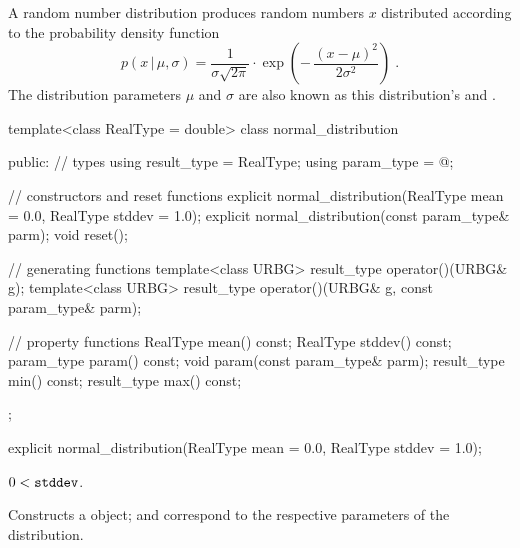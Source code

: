 \pnum
A  random number distribution
produces random numbers $x$
distributed according to
the probability density function%
%
%
\[%
 p(x\,|\,\mu,\sigma)
      = \frac{1}{\sigma \sqrt{2\pi}}
        \cdot
        \exp{\left(- \, \frac{(x - \mu)^2}
                             {2 \sigma^2}
             \right)
            }
\; \mbox{.}
\]
The distribution parameters $\mu$ and $\sigma$
are also known as this distribution's %
%
and %
%
%
.

%
\begin{codeblock}
template<class RealType = double>
  class normal_distribution {
  public:
    // types
    using result_type = RealType;
    using param_type  = @\unspec@;

    // constructors and reset functions
    explicit normal_distribution(RealType mean = 0.0, RealType stddev = 1.0);
    explicit normal_distribution(const param_type& parm);
    void reset();

    // generating functions
    template<class URBG>
      result_type operator()(URBG& g);
    template<class URBG>
      result_type operator()(URBG& g, const param_type& parm);

    // property functions
    RealType mean() const;
    RealType stddev() const;
    param_type param() const;
    void param(const param_type& parm);
    result_type min() const;
    result_type max() const;
  };
\end{codeblock}


%
\begin{itemdecl}
explicit normal_distribution(RealType mean = 0.0, RealType stddev = 1.0);
\end{itemdecl}

\begin{itemdescr}
\pnum\requires
 $ 0 < \texttt{\protect stddev} $.

\pnum\effects Constructs a  object;
  and 
 correspond to the respective parameters of the distribution.
\end{itemdescr}


